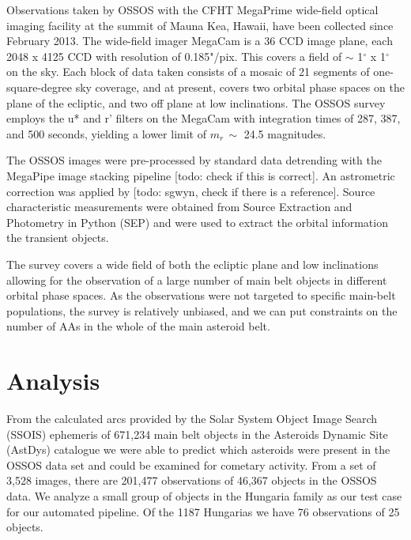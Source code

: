 \documentclass[iop,apj]{emulateapj}
\begin{document}
Observations taken by OSSOS with the CFHT MegaPrime wide-field optical imaging facility at the summit of Mauna Kea, Hawaii, have been collected since February 2013. The wide-field imager MegaCam is a 36 CCD image plane, each 2048 x 4125 CCD with resolution of 0.185"/pix. This covers a field of  $\sim$ 1$^{\circ}$ x 1$^{\circ}$ on the sky. Each block of data taken consists of a mosaic of 21 segments of one-square-degree sky coverage, and at present, covers two orbital phase spaces on the plane of the ecliptic, and two off plane at low inclinations. The OSSOS survey employs the u* and r' filters on the MegaCam with integration times of 287, 387, and 500 seconds, yielding a lower limit of $m_r \, \sim$ 24.5 magnitudes.

The OSSOS images were pre-processed by standard data detrending with the MegaPipe image stacking pipeline [todo: check if this is correct]. An astrometric correction was applied by [todo: sgwyn, check if there is a reference]. Source characteristic measurements were obtained from Source Extraction and Photometry in Python (SEP) and were used to extract the orbital information the transient objects. 

The survey covers a wide field of both the ecliptic plane and low inclinations allowing for the observation of a large number of main belt objects in different orbital phase spaces. As the observations were not targeted to specific main-belt populations, the survey is relatively unbiased, and we can put constraints on the number of AAs  in the whole of the main asteroid belt.



\section{Analysis}

From the calculated arcs provided by the Solar System Object Image Search (SSOIS) ephemeris \citep{ssois} of 671,234 main belt objects in the Asteroids Dynamic Site (AstDys) catalogue \citep{astdys} we were able to predict which asteroids were present in the OSSOS data set and could be examined for cometary activity. From a set of 3,528 images, there are 201,477 observations of 46,367 objects in the OSSOS data. We analyze a small group of objects in the Hungaria family as our test case for our automated pipeline. Of the 1187 Hungarias we have 76 observations of 25 objects. 
\end{document}
